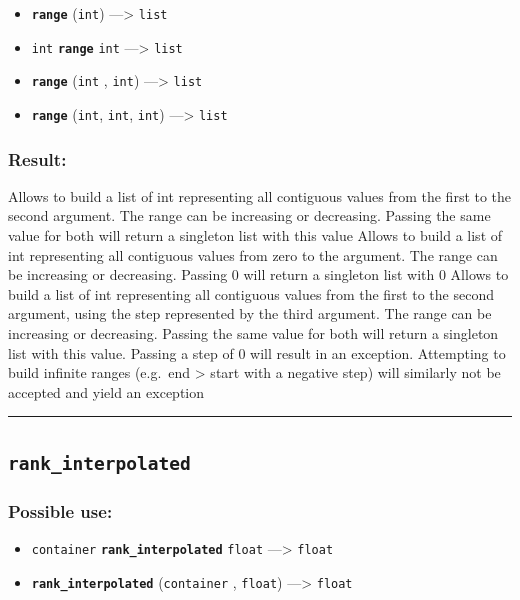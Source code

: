 \documentclass[]{book}
\providecommand{\tightlist}{%
  \setlength{\itemsep}{0pt}\setlength{\parskip}{0pt}}
\theoremstyle{definition}
\theoremstyle{definition}
\theoremstyle{definition}
\theoremstyle{remark}
\begin{document}
\begin{itemize}
\tightlist
\item
  \textbf{\texttt{range}} (\texttt{int}) ---\textgreater{} \texttt{list}
\item
  \texttt{int} \textbf{\texttt{range}} \texttt{int} ---\textgreater{}
  \texttt{list}
\item
  \textbf{\texttt{range}} (\texttt{int} , \texttt{int})
  ---\textgreater{} \texttt{list}
\item
  \textbf{\texttt{range}} (\texttt{int}, \texttt{int}, \texttt{int})
  ---\textgreater{} \texttt{list}
\end{itemize}

\subsubsection{Result:}\label{result-413}

Allows to build a list of int representing all contiguous values from
the first to the second argument. The range can be increasing or
decreasing. Passing the same value for both will return a singleton list
with this value Allows to build a list of int representing all
contiguous values from zero to the argument. The range can be increasing
or decreasing. Passing 0 will return a singleton list with 0 Allows to
build a list of int representing all contiguous values from the first to
the second argument, using the step represented by the third argument.
The range can be increasing or decreasing. Passing the same value for
both will return a singleton list with this value. Passing a step of 0
will result in an exception. Attempting to build infinite ranges
(e.g.~end \textgreater{} start with a negative step) will similarly not
be accepted and yield an exception

\begin{center}\rule{0.5\linewidth}{\linethickness}\end{center}

\subsection{\texorpdfstring{\texttt{rank\_interpolated}}{rank\_interpolated}}\label{rank_interpolated}

\subsubsection{Possible use:}\label{possible-use-428}

\begin{itemize}
\tightlist
\item
  \texttt{container} \textbf{\texttt{rank\_interpolated}} \texttt{float}
  ---\textgreater{} \texttt{float}
\item
  \textbf{\texttt{rank\_interpolated}} (\texttt{container} ,
  \texttt{float}) ---\textgreater{} \texttt{float}
\end{itemize}
\end{document}
